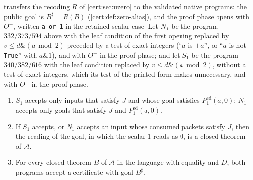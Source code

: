  transfers the recoding $R$ of
\cref{cert:sec:uzero} to the validated native programs: the public goal is
$B^{\sharp}=R(B)$ (\cref{cert:def:zero-alias}), and the proof phase opens with
$O^{+}$, written \texttt{a or 1} in the retained-scalar case. Let $N_1$ be the
program $332/373/594$ above with the leaf condition of the first opening
replaced by $v\le d\mathbin{\&}(a\bmod 2)$ preceded by a test of exact integers
(``$a$ is $+a$'', or ``$a$ is not \texttt{True}'' with $a\mathbin{\&}1$), and with
$O^{+}$ in the proof phase; and let $S_1$ be the program $340/382/616$ with the
leaf condition replaced by $v\le d\mathbin{\&}(a\bmod 2)$, without a test of
exact integers, which its test of the printed form makes unnecessary, and with
$O^{+}$ in the proof phase.

\begin{proposition}\label{cert:prop:uzero-native}
\begin{enumerate}[label=(\alph*)]
\item $S_1$ accepts only inputs that satisfy $J$ and whose goal satisfies
$P^{\mathrm{ed}}_{1}(a,0)$; $N_1$ accepts only goals that satisfy $J$ and
$P^{\mathrm{ed}}_{1}(a,0)$.
\item If $S_1$ accepts, or $N_1$ accepts an input whose consumed packets
satisfy $J$, then the reading of the goal, in which the scalar $1$ reads as
$0$, is a closed theorem of $\mathcal A$.
\item For every closed theorem $B$ of $\mathcal A$ in the language with
equality and $D$, both programs accept a certificate with goal $B^{\sharp}$.
\end{enumerate}
\end{proposition}
